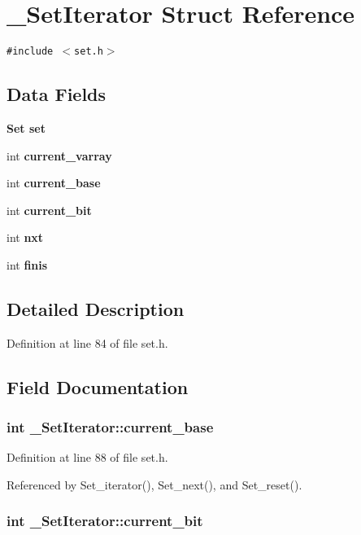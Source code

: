 \section{\_\-Set\-Iterator Struct Reference}
\label{struct__SetIterator}
{\tt \#include $<$set.h$>$}

\subsection*{Data Fields}
\begin{CompactItemize}
\item 
\bf{Set} \bf{set}
\item 
int \bf{current\_\-varray}
\item 
int \bf{current\_\-base}
\item 
int \bf{current\_\-bit}
\item 
int \bf{nxt}
\item 
int \bf{finis}
\end{CompactItemize}


\subsection{Detailed Description}




Definition at line 84 of file set.h.

\subsection{Field Documentation}
\subsubsection{\setlength{\rightskip}{0pt plus 5cm}int \bf{\_\-Set\-Iterator::current\_\-base}}\label{struct__SetIterator_35a57623f43f73e19b1fcaa6e5b2c168}




Definition at line 88 of file set.h.

Referenced by Set\_\-iterator(), Set\_\-next(), and Set\_\-reset().
\subsubsection{\setlength{\rightskip}{0pt plus 5cm}int \bf{\_\-Set\-Iterator::current\_\-bit}}\label{struct__SetIterator_6bb59f59d545c17456a00265af84a006}




